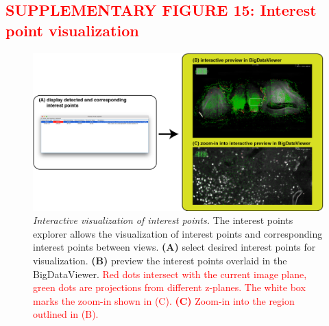 \documentclass[]{spie}  %
\def\red{\textcolor{red}}
\begin{document}
\subsection*{\red{SUPPLEMENTARY FIGURE 15: Interest point visualization}}
\vspace{1mm}
\begin{figure}[h!]
\includegraphics[width=\textwidth]{Supp-IntrestPoints.png}
\vspace{-2.0mm}
\caption{\hspace{-0.5mm} \emph{Interactive visualization of interest points.} The interest points explorer allows the visualization of interest points and corresponding interest points between views. \textbf{(A)} select desired interest points for visualization. \textbf{(B)} preview the interest points overlaid in the BigDataViewer. \red{Red dots intersect with the current image plane, green dots are projections from different z-planes. The white box marks the zoom-in shown in (C). \textbf{(C)} Zoom-in into the region outlined in (B).}
}
\label{fig:sup-fig-interest-point}
\end{figure}

\pagebreak
\end{document}
